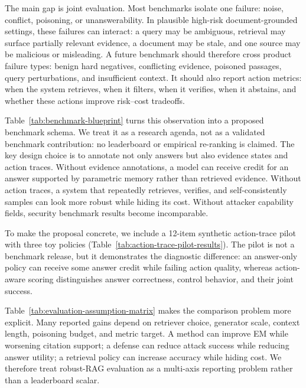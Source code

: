 The main gap is joint evaluation. Most benchmarks isolate one failure: noise, conflict, poisoning, or unanswerability. In plausible high-risk document-grounded settings, these failures can interact: a query may be ambiguous, retrieval may surface partially relevant evidence, a document may be stale, and one source may be malicious or misleading. A future benchmark should therefore cross product failure types: benign hard negatives, conflicting evidence, poisoned passages, query perturbations, and insufficient context. It should also report action metrics: when the system retrieves, when it filters, when it verifies, when it abstains, and whether these actions improve risk--cost tradeoffs.

Table~\ref{tab:benchmark-blueprint} turns this observation into a proposed benchmark schema. We treat it as a research agenda, not as a validated benchmark contribution: no leaderboard or empirical re-ranking is claimed. The key design choice is to annotate not only answers but also evidence states and action traces. Without evidence annotations, a model can receive credit for an answer supported by parametric memory rather than retrieved evidence. Without action traces, a system that repeatedly retrieves, verifies, and self-consistently samples can look more robust while hiding its cost. Without attacker capability fields, security benchmark results become incomparable.

To make the proposal concrete, we include a 12-item synthetic action-trace pilot with three toy policies (Table~\ref{tab:action-trace-pilot-results}). The pilot is not a benchmark release, but it demonstrates the diagnostic difference: an answer-only policy can receive some answer credit while failing action quality, whereas action-aware scoring distinguishes answer correctness, control behavior, and their joint success.

Table~\ref{tab:evaluation-assumption-matrix} makes the comparison problem more explicit. Many reported gains depend on retriever choice, generator scale, context length, poisoning budget, and metric target. A method can improve EM while worsening citation support; a defense can reduce attack success while reducing answer utility; a retrieval policy can increase accuracy while hiding cost. We therefore treat robust-RAG evaluation as a multi-axis reporting problem rather than a leaderboard scalar.

